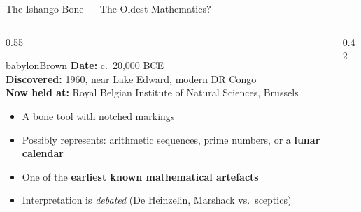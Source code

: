 \begin{frame}[shrink=13]{The Ishango Bone --- The Oldest Mathematics?}

  \begin{columns}[T]
    \begin{column}{0.55\textwidth}
      \begin{personbox}{babylonBrown}
        \small
        \textbf{Date:} c.\ 20,000 BCE\\
        \textbf{Discovered:} 1960, near Lake Edward, modern DR Congo\\
        \textbf{Now held at:} Royal Belgian Institute of Natural Sciences, Brussels
      \end{personbox}

      \vspace{0.5em}
      \begin{itemize}
        \item A bone tool with \alert{notched markings}
        \item Possibly represents: arithmetic sequences, prime numbers, or a \textbf{lunar calendar}
        \item One of the \textbf{earliest known mathematical artefacts}
        \item Interpretation is \emph{debated} (De Heinzelin, Marshack vs.\ sceptics)
      \end{itemize}
    \end{column}

    \begin{column}{0.42\textwidth}

      \vspace{0.3em}
    \end{column}
  \end{columns}

\end{frame}

